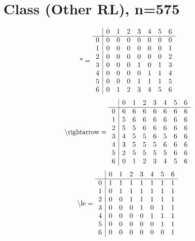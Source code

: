 \documentclass[11pt]{article}
\begin{document}
\section{Class (Other RL), n=575}
\[\text{*} = 
\begin{array}{r | r r r r r r r}
 & 0 & 1 & 2 & 3 & 4 & 5 & 6 \\ \hline
0 & 0 & 0 & 0 & 0 & 0 & 0 & 0 \\
1 & 0 & 0 & 0 & 0 & 0 & 0 & 1 \\
2 & 0 & 0 & 0 & 0 & 0 & 0 & 2 \\
3 & 0 & 0 & 0 & 1 & 0 & 1 & 3 \\
4 & 0 & 0 & 0 & 0 & 1 & 1 & 4 \\
5 & 0 & 0 & 0 & 1 & 1 & 1 & 5 \\
6 & 0 & 1 & 2 & 3 & 4 & 5 & 6 \\
\end{array}
\]
\[\text{\textbackslash rightarrow} = 
\begin{array}{r | r r r r r r r}
 & 0 & 1 & 2 & 3 & 4 & 5 & 6 \\ \hline
0 & 6 & 6 & 6 & 6 & 6 & 6 & 6 \\
1 & 5 & 6 & 6 & 6 & 6 & 6 & 6 \\
2 & 5 & 5 & 6 & 6 & 6 & 6 & 6 \\
3 & 4 & 5 & 5 & 6 & 5 & 6 & 6 \\
4 & 3 & 5 & 5 & 5 & 6 & 6 & 6 \\
5 & 2 & 5 & 5 & 5 & 5 & 6 & 6 \\
6 & 0 & 1 & 2 & 3 & 4 & 5 & 6 \\
\end{array}
\]
\[\text{\textbackslash le} = 
\begin{array}{r | r r r r r r r}
 & 0 & 1 & 2 & 3 & 4 & 5 & 6 \\ \hline
0 & 1 & 1 & 1 & 1 & 1 & 1 & 1 \\
1 & 0 & 1 & 1 & 1 & 1 & 1 & 1 \\
2 & 0 & 0 & 1 & 1 & 1 & 1 & 1 \\
3 & 0 & 0 & 0 & 1 & 0 & 1 & 1 \\
4 & 0 & 0 & 0 & 0 & 1 & 1 & 1 \\
5 & 0 & 0 & 0 & 0 & 0 & 1 & 1 \\
6 & 0 & 0 & 0 & 0 & 0 & 0 & 1 \\
\end{array}
\]
\end{document}

